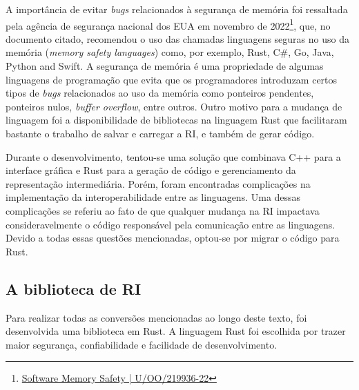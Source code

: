 \documentclass[
	12pt,				%
	openright,			%
	oneside,			%
	a4paper,			%
	main=brazil,
	english,			%
	]{ufsj-abntex2}
\begin{document}
A importância de evitar \textit{bugs} relacionados à segurança de memória foi ressaltada pela agência de segurança nacional dos EUA em novembro de 2022\footnote{\href{https://media.defense.gov/2022/Nov/10/2003112742/-1/-1/0/CSI_SOFTWARE_MEMORY_SAFETY.PDF}{Software Memory Safety | U/OO/219936-22}}, que, no documento citado, recomendou o uso das chamadas linguagens seguras no uso da memória (\textit{memory safety languages}) como, por exemplo, Rust, C\#, Go, Java, Python and Swift. A segurança de memória é uma propriedade de algumas linguagens de programação que evita que os programadores introduzam certos tipos de \textit{bugs} relacionados ao uso da memória como ponteiros pendentes, ponteiros nulos, \textit{buffer overflow}, entre outros. Outro motivo para a mudança de linguagem foi a disponibilidade de bibliotecas na linguagem Rust que facilitaram bastante o trabalho de salvar e carregar a RI, e também de gerar código. 

Durante o desenvolvimento, tentou-se uma solução que combinava C++ para a interface gráfica e Rust para a geração de código e gerenciamento da representação intermediária. Porém, foram encontradas complicações na implementação da interoperabilidade entre as linguagens. Uma dessas complicações se referiu ao fato de que qualquer mudança na RI impactava consideravelmente o código responsável pela comunicação entre as linguagens. Devido a todas essas questões mencionadas, optou-se por migrar o código para Rust. 


\subsection{A biblioteca de RI}
\label{sub:ri}

Para realizar todas as conversões mencionadas ao longo deste texto, foi desenvolvida uma biblioteca em Rust. A linguagem Rust foi escolhida por trazer maior segurança, confiabilidade e facilidade de desenvolvimento. 

\end{document}
